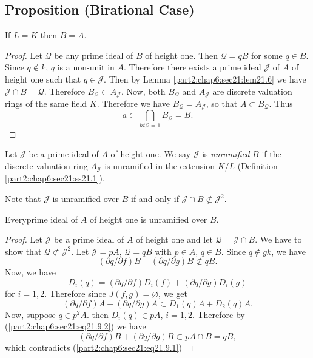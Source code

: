 \setcounter{subsection}{6}
\subsection{Proposition (Birational Case)}\label{part2:chap6:sec21:ss21.7}

If $L=K$ then $B=A$.

\begin{proof}
  Let $\mathscr{Q}$ be any prime ideal of $B$ of height one. Then
  $\mathscr{Q}= qB$ for some $q \in B$. Since $q \notin k$, $q$ is a
  non-unit in $A$. Therefore there exists a prime ideal $\mathscr{J}$
  of $A$ of height one such that $q \in \mathscr{J}$. Then by
  Lemma \ref{part2:chap6:sec21:lem21.6} we have $\mathscr{J} \cap B=
  \mathscr{Q}$. Therefore $B_{\mathscr{Q}} \subset
  A_{\mathscr{J}}$. Now, both $B_{\mathscr{Q}}$ and $A_{\mathscr{J}}$
  are discrete valuation rings of the same field $K$. Therefore we
  have $B_{\mathscr{Q}}= A_{\mathscr{J}}$, so that $A \subset
  B_{\mathscr{Q}}$. Thus 
$$
a \subset  \bigcap\limits_{ht \mathscr{Q} =1} B_{\mathscr{Q}} = B.
$$
\end{proof}

\setcounter{thm}{7}
\begin{defi}\label{part2:chap6:sec21:def21.8}
  Let $\mathscr{J}$ be a prime ideal of $A$ of height one. We say
  $\mathscr{J}$ is {\em unramified} $B$ if the discrete valuation ring
  $A_{\mathscr{J}}$ is unramified in the extension $K/L$
  (Definition \ref{part2:chap6:sec21:ss21.1}).
\end{defi}

Note that $\mathscr{J}$ is unramified over $B$ if and only if
$\mathscr{J} \cap B \nsubset \mathscr{J}^2$.

\begin{lemma}\label{part2:chap6:sec21:lem21.9}
  Every\pageoriginale prime ideal of $A$ of height one is unramified over $B$. 
\end{lemma}

\begin{proof}
  Let $\mathscr{J}$ be a prime ideal of $A$ of height one and let
  $\mathscr{Q}= \mathscr{J} \cap B$. We have to show that $\mathscr{Q}
  \nsubset \mathscr{J}^2$. Let $\mathscr{J} = pA$, $\mathscr{Q} =
  qB$ with $p \in A$, $q \in B$. Since  $q \notin g k$, we have
\begin{equation*}
  (\partial q/ \partial f) B + (\partial q /\partial g) B \nsubset q
  B. \tag{21.9.1}\label{part2:chap6:sec21:eq21.9.1}
\end{equation*}
Now, we have
$$
D_i (q) = (\partial q/\partial f)D_i (f) + (\partial q / \partial g)
D_i (g)
$$
for $i = 1, 2$. Therefore since $J(f, g)= \diameter$, we get
\begin{equation*}
  (\partial q/ \partial f) A + (\partial q/\partial g) A \subset D_1
  (q) A+ D_2 (q) A. \tag{21.9.2}\label{part2:chap6:sec21:eq21.9.2}
\end{equation*}
Now, suppose $q \in p^2 A$. then $D_i (q) \in pA$, $i = 1,
2$. Therefore by (\ref{part2:chap6:sec21:eq21.9.2}) we have
$$
(\partial q / \partial f)B + (\partial q/ \partial g) B \subset p A
\cap B = q B,
$$
which contradicts (\ref{part2:chap6:sec21:eq21.9.1})
\end{proof}

